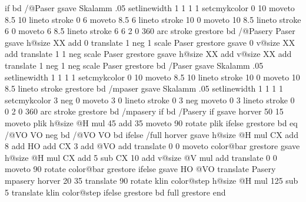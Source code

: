 {{{{    if } bd
 /@Paser {gsave Skalamm .05 setlinewidth 1 1 1 1 setcmykcolor
   0 10 moveto 8.5 10 lineto stroke 0 6 moveto 8.5 6 lineto stroke
   10 0 moveto 10 8.5 lineto stroke 6 0 moveto 6 8.5 lineto stroke
   6 6 2 0 360 arc stroke grestore} bd
 /@Pasery {Paser
   gsave h@size XX add 0 translate 1 neg 1 scale Paser grestore
   gsave 0 v@size XX add translate 1 1 neg scale Paser grestore
   gsave h@size XX add v@size XX add translate 1 neg 1 neg scale Paser grestore
   } bd
 /Paser {gsave Skalamm .05 setlinewidth 1 1 1 1 setcmykcolor
   0 10 moveto 8.5 10 lineto stroke
   10 0 moveto 10 8.5 lineto stroke
   grestore} bd
 /mpaser {gsave Skalamm .05 setlinewidth 1 1 1 1 setcmykcolor
   3 neg 0 moveto 3 0 lineto stroke
   0 3 neg moveto 0 3 lineto stroke
   0 0 2 0 360 arc stroke
   grestore} bd
 /mpasery {
    if } bd
 /Pasery {
    if
   gsave
   horver
   {50 15 moveto plik}
   {h@size @H mul 45 add 35 moveto 90 rotate plik}
   ifelse
   grestore
   } bd
 \the\Orient{} eq {/@VO {VO neg} bd }{/@VO {VO} bd } ifelse
 /full {
   horver
   {gsave h@size @H mul CX add 8 add HO add CX 3 add @VO add translate 0 0 moveto color@bar grestore}
 {gsave h@size @H mul CX add 5 sub CX 10 add v@size @V mul add translate 0 0 moveto 90 rotate color@bar grestore}
   ifelse
   gsave
   HO @VO translate Pasery mpasery
   horver
   {20 35 translate 90 rotate klin color@step}
   {h@size @H mul 125 sub 5 translate klin color@step}
   ifelse
   grestore
   } bd
   full
   grestore
   }end}}
